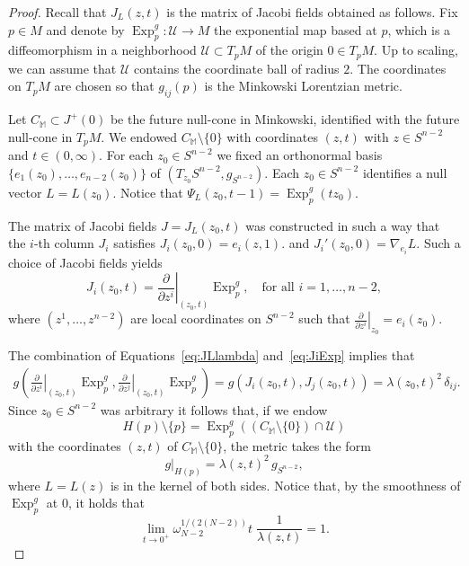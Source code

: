 \documentclass[12pt,a4paper]{amsart}
\theoremstyle{plain}
\theoremstyle{definition}
\numberwithin{equation}{section}
\DeclareMathOperator{\Exp}{Exp}
\newcommand{\gflow}{\Psi}
\begin{document}
\begin{proof}
 Recall that $J_L(z,t)$ is the matrix of Jacobi fields obtained as follows. Fix $p\in M$ and denote by $\Exp^g_p: \mathcal{U}\to M$ the exponential map based at $p$, which is a diffeomorphism in a neighborhood $\mathcal{U}\subset T_pM$ of the origin $0\in T_pM$. Up to scaling, we can assume that $\mathcal{U}$ contains the coordinate ball of radius $2$. The coordinates on $T_pM$ are chosen so that $g_{ij}(p)$ is the Minkowski Lorentzian metric.

Let $C_{\mathbb M}\subset J^+(0)$ be the future null-cone in Minkowski, identified with the future null-cone in $T_pM$. We endowed  $C_{\mathbb M}\setminus\{0\}$ with coordinates $(z,t)$ with $z\in S^{n-2}$ and $t\in (0,\infty)$.
For each $z_0\in S^{n-2}$ we fixed an orthonormal basis $\{e_1(z_0),
\ldots, e_{n-2}(z_0)\}$ of $(T_{z_0} S^{n-2}, g_{S^{n-2}})$. Each
$z_0\in S^{n-2}$ identifies a null vector $L=L(z_0)$.
%
Notice that   $\gflow_L(z_0,t-1)=\Exp^g_p(tz_0)$.

The matrix of Jacobi fields $J=J_L(z_0,t)$ was constructed in such a way that
the $i$-th column $J_i$ satisfies
$J_i(z_0,0)=e_i(z,1)$.
and $J_i'(z_0,0)=\nabla_{e_i}L$. Such a choice of Jacobi fields yields 
\begin{equation}\label{eq:JiExp}
J_i(z_0,t)=\left. \frac{\partial}{\partial z^i} \right|_{(z_0,t)} \Exp^g_p, \quad \text{for all }i=1,\ldots, n-2,
\end{equation}
where $(z^1, \ldots, z^{n-2})$ are  local coordinates on $S^{n-2}$ such that $\left. \frac{\partial}{\partial z^i} \right|_{z_0}= e_i(z_0)$.

The combination of Equations~\eqref{eq:JLlambda} and~\eqref{eq:JiExp} implies that
\begin{align}
g\left( \left. \frac{\partial}{\partial z^i} \right|_{(z_0,t)} \Exp^g_p, \left. \frac{\partial}{\partial z^j} \right|_{(z_0,t)} \Exp^g_p \right)=g\left(J_i(z_0,t), J_j(z_0,t)\right)=\lambda(z_0,t)^2 \,  \delta_{ij}.
\end{align}
Since $z_0\in S^{n-2}$ was arbitrary it follows that, if we endow 
\begin{equation}\label{eq:HExpC}
H(p)\setminus\{p\}=\Exp^g_p((C_{\mathbb M} \setminus\{0\}) \cap \mathcal{U})
\end{equation}
with the coordinates $(z,t)$ of $C_{\mathbb M} \setminus\{0\}$, the metric  takes the form
\begin{equation}\label{eq:gHpgS}
g|_{H(p)}= \lambda(z,t)^2 \, g_{S^{n-2}},
\end{equation}
where $L=L(z)$ is in the kernel of both sides. Notice that, by the smoothness of $\Exp^g_p$ at $0$, it holds that
\begin{equation}\label{eq:lambdaTo0}
\lim_{t\to 0^+}  \omega_{N-2}^{1/(2(N-2))} t \; \frac{1}{\lambda(z,t)} =1.
\end{equation}




\end{proof}
\end{document}
